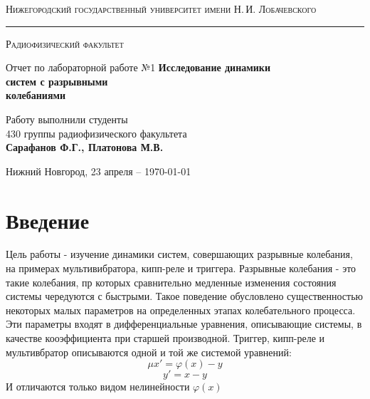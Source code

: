 \documentclass[a4paper,14pt]{extarticle}
\def\labauthors{Сарафанов Ф.Г., Платонова М.В.}
\def\labnumber{1}
\begin{document}
\begin{titlepage}
\begin{center}
{\small\textsc{Нижегородский государственный университет имени Н.\,И. Лобачевского}}
\vskip 2pt \hrule \vskip 3pt
{\small\textsc{Радиофизический факультет}}

\vfill


{{\large Отчет по лабораторной работе №\labnumber}\vskip 12pt {\Huge \bfseries Исследование динамики\\[0em] систем с разрывными \\[0.2em]колебаниями}}

	
\vspace{2cm}
{\large Работу выполнили студенты \\[-0.25em] 430 группы радиофизического факультета \\[0.5em] {\Large \bfseries \labauthors}}



\end{center}

\vfill
	
	
	
\begin{center}
	{Нижний Новгород, 23 апреля -- \today}
\end{center}

\end{titlepage}
\tableofcontents
\newpage





\section*{Введение}
Цель работы - изучение динамики систем, совершающих разрывные колебания, на примерах мультивибратора, кипп-реле и триггера.
Разрывные колебания - это такие колебания, пр которых сравнительно медленные изменения состояния системы чередуются с быстрыми. Такое поведение обусловлено существенностью некоторых малых параметров на определенных этапах колебательного процесса. Эти параметры входят в дифференциальные уравнения, описывающие системы, в качестве кооэффициента при старшей производной. 
Триггер, кипп-реле и мультивбратор описываются одной и той же системой уравнений:
$$\mu x' = \varphi(x) - y $$
$$y' = x - y$$
И отличаются только видом нелинейности $\varphi(x)$
\end{document}

